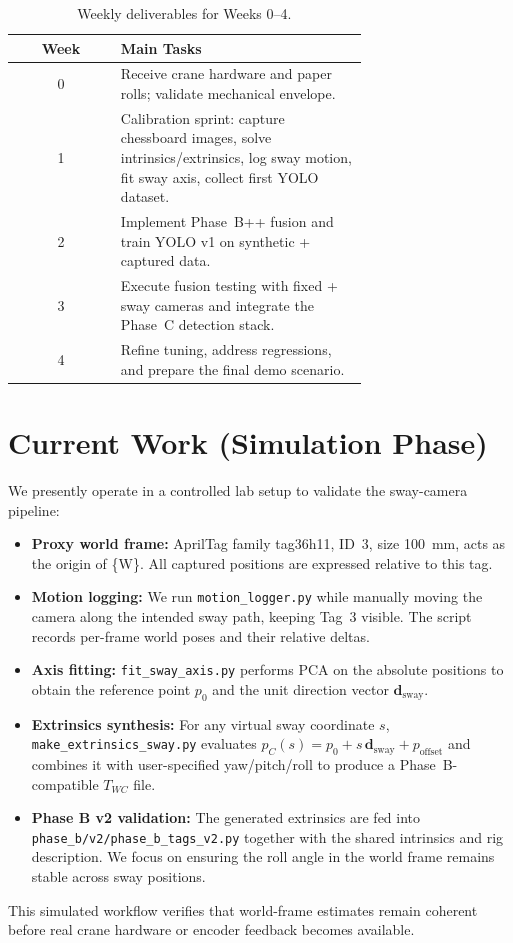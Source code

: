 \documentclass[11pt]{article}
\begin{document}
\begin{table}[h]
    \centering
    \begin{tabular}{|c|p{0.7\linewidth}|}
        \hline
        \textbf{Week} & \textbf{Main Tasks} \\\hline
        0 & Receive crane hardware and paper rolls; validate mechanical envelope. \\\hline
        1 & Calibration sprint: capture chessboard images, solve intrinsics/extrinsics, log sway motion, fit sway axis, collect first YOLO dataset. \\\hline
        2 & Implement Phase~B++ fusion and train YOLO v1 on synthetic + captured data. \\\hline
        3 & Execute fusion testing with fixed + sway cameras and integrate the Phase~C detection stack. \\\hline
        4 & Refine tuning, address regressions, and prepare the final demo scenario. \\\hline
    \end{tabular}
    \caption{Weekly deliverables for Weeks 0--4.}
    \label{tab:timeline}
\end{table}

\section{Current Work (Simulation Phase)}
We presently operate in a controlled lab setup to validate the sway-camera pipeline:
\begin{itemize}
    \item \textbf{Proxy world frame:} AprilTag family tag36h11, ID~3, size \SI{100}{\milli\meter}, acts as the origin of \{W\}. All captured positions are expressed relative to this tag.
    \item \textbf{Motion logging:} We run \texttt{motion\_logger.py} while manually moving the camera along the intended sway path, keeping Tag~3 visible. The script records per-frame world poses and their relative deltas.
    \item \textbf{Axis fitting:} \texttt{fit\_sway\_axis.py} performs PCA on the absolute positions to obtain the reference point $p_0$ and the unit direction vector $\mathbf{d}_{\text{sway}}$.
    \item \textbf{Extrinsics synthesis:} For any virtual sway coordinate $s$, \texttt{make\_extrinsics\_sway.py} evaluates $p_C(s) = p_0 + s\,\mathbf{d}_{\text{sway}} + p_{\text{offset}}$ and combines it with user-specified yaw/pitch/roll to produce a Phase~B-compatible $T_{WC}$ file.
    \item \textbf{Phase B v2 validation:} The generated extrinsics are fed into \texttt{phase\_b/v2/phase\_b\_tags\_v2.py} together with the shared intrinsics and rig description. We focus on ensuring the roll angle in the world frame remains stable across sway positions.
\end{itemize}
This simulated workflow verifies that world-frame estimates remain coherent before real crane hardware or encoder feedback becomes available.
\end{document}
